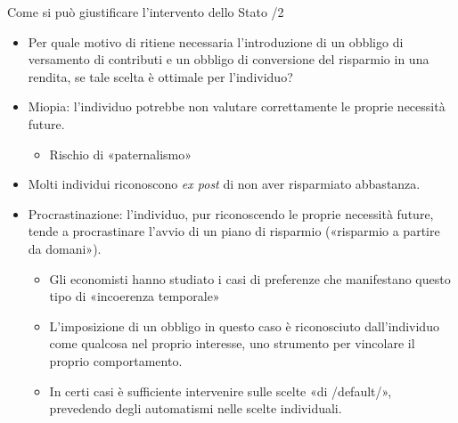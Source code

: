 \documentclass[aspectratio=64,11pt]{beamer}
\begin{document}
\begin{frame}{Come si può giustificare l'intervento dello Stato /2}
\begin{itemize}
\item Per quale motivo di ritiene necessaria l'introduzione di un obbligo di
versamento di contributi e un obbligo di conversione del risparmio in una
rendita, se tale scelta è ottimale per l'individuo?
\item \alert{Miopia}: l'individuo potrebbe non valutare correttamente le proprie
necessità future.
\begin{itemize}
\item Rischio di «paternalismo»
\end{itemize}
\item Molti individui riconoscono \emph{ex post} di non aver risparmiato abbastanza.
\item \alert{Procrastinazione}: l'individuo, pur riconoscendo le proprie necessità
future, tende a procrastinare l'avvio di un piano di risparmio («risparmio a
partire da domani»).
\begin{itemize}
\item Gli economisti hanno studiato i casi di preferenze che manifestano questo
tipo di «incoerenza temporale»
\item L'imposizione di un obbligo in questo caso è riconosciuto dall'individuo
come qualcosa nel proprio interesse, uno strumento per vincolare il
proprio comportamento.
\item In certi casi è sufficiente intervenire sulle scelte «di /default/»,
prevedendo degli automatismi nelle scelte individuali.
\end{itemize}
\end{itemize}
\end{frame}
\end{document}
